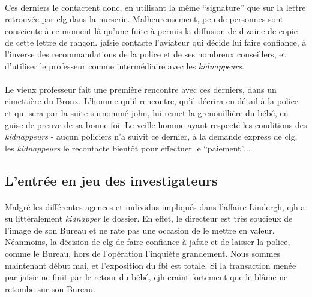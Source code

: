\paragraph{} Ces derniers le contactent donc, en utilisant la même ``signature'' que sur la lettre retrouvée par \gls{clg} dans la nurserie.
Malheureusement, peu de personnes sont consciente à ce moment là qu'une fuite à permis la diffusion de dizaine de copie de cette lettre
de rançon. \gls{jafsie} contacte l'aviateur qui décide lui faire confiance, à l'inverse des recommandations de la police et de ses nombreux
conseillers, et d'utiliser le professeur comme intermédiaire avec les \emph{kidnappeurs}. 
\paragraph{} Le vieux professeur fait une première rencontre avec ces derniers, dans un cimettière du Bronx. L'homme qu'il rencontre, qu'il
décrira en détail à la police et qui sera par la suite surnommé \gls{john}, lui remet la grenouillière du bébé, en guise de preuve de sa 
bonne foi. Le veille homme ayant respecté les conditions des \emph{kidnappeurs} - aucun policiers n'a suivit ce dernier, à la demande express
de \gls{clg}, les \emph{kidnappeurs} le recontacte bientôt pour effectuer le ``paiement''...
 







\subsection{L'entrée en jeu des investigateurs}
\paragraph{} Malgré les différentes agences et individus impliqués dans l'affaire Lindergh, \gls{ejh} a su littéralement \emph{kidnapper} le dossier. En 
effet, le directeur est très soucieux de l'image de son Bureau et ne rate pas une occasion de le mettre en valeur. Néanmoins, la décision de \gls{clg} de
faire confiance à \gls{jafsie} et de laisser la police, comme le Bureau, hors de l'opération l'inquiète grandement. Nous sommes maintenant début mai, et
l'exposition du \gls{fbi} est totale. Si la transaction menée par \gls{jafsie} ne finit par le retour du bébé, \gls{ejh} craint fortement que le blâme ne
retombe sur son Bureau.
